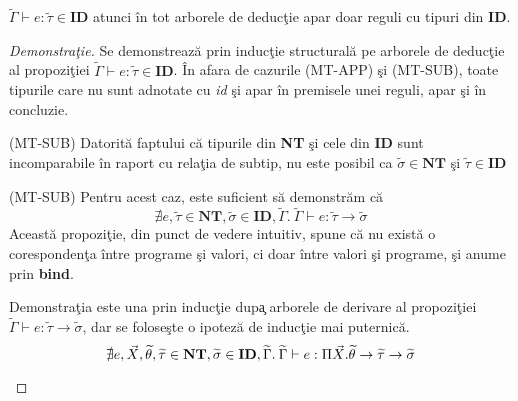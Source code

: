 \begin{lemma}
$\widetilde{\Gamma} \vdash e : \widetilde{\tau} \in \textbf{ID}$ atunci \^ in tot arborele de deduc\c tie apar doar reguli cu tipuri din \textbf{ID}.
\end{lemma}
\begin{proof}[Demonstra\c tie]
Se demonstreaz\u a prin induc\c tie structural\u a pe arborele de deduc\c tie al propozi\c tiei $\widetilde{\Gamma} \vdash e : \widetilde{\tau} \in \textbf{ID}$. \^ In afara de cazurile {\scriptsize (MT-APP)} \c si {\scriptsize (MT-SUB)}, toate tipurile care nu sunt adnotate cu \emph{id} \c si apar \^ in premisele unei reguli, apar \c si \^ in concluzie.
\begin{description*}
\item [{\scriptsize (MT-SUB)}] Datorit\u a faptului c\u a tipurile din \textbf{NT} \c si cele din \textbf{ID} sunt incomparabile \^ in raport cu rela\c tia de subtip, nu este posibil ca $\widetilde{\sigma} \in \textbf{NT}$ \c si $\widetilde{\tau} \in \textbf{ID}$
\item [{\scriptsize (MT-SUB)}] Pentru acest caz, este suficient s\u a demonstr\u am c\u a
    \begin{equation}
    \nexists e,\widetilde{\tau} \in \textbf{NT},\widetilde{\sigma} \in \textbf{ID},\widetilde{\Gamma}.\: \widetilde{\Gamma} \vdash e : \widetilde{\tau} \to \widetilde{\sigma}
    \end{equation}
    Aceast\u a propozi\c tie, din punct de vedere intuitiv, spune c\u a nu exist\u a o coresponden\c ta \^ intre programe \c si valori, ci doar \^ intre valori \c si programe, \c si anume prin \textbf{bind}.

    Demonstra\c tia este una prin induc\c tie dup\c a arborele de derivare al propozi\c tiei $\widetilde{\Gamma} \vdash e : \widetilde{\tau} \to \widetilde{\sigma}$, dar se folose\c ste o ipotez\u a de induc\c tie mai puternic\u a.
    \begin{equation}
        \nexists e,\vec{X},\widetilde{\theta},\widetilde{\tau} \in \textbf{NT},\widetilde{\sigma} \in \textbf{ID},\widetilde{\Gamma}.\: \widetilde{\Gamma} \vdash e : \Pi \vec{X}.\widetilde{\theta}\to\widetilde{\tau} \to \widetilde{\sigma}
        \qedhere
    \end{equation}
    \done{}
\end{description*}
\end{proof}

